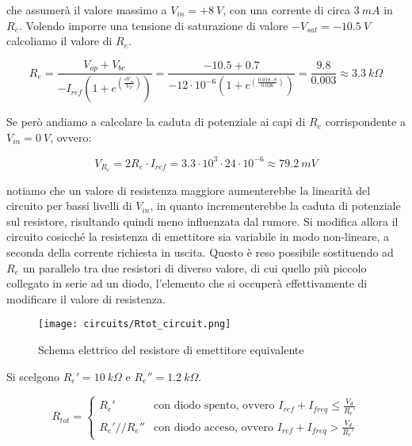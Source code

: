 che assumerà il valore massimo a $V_{in}=+8\ V$, con una corrente di circa $3\ mA$  in $R_e$.
Volendo imporre una tensione di saturazione di valore $-V_{sat}=-10.5\ V$ calcoliamo il valore
di $R_e$.

\begin{equation}
    R_e=\frac{V_{op}+V_{be}}{-I_{ref}\left(1+e^{\left(\frac{sV_{in}}{V_T}\right)}\right)}=
    \frac{-10.5+0.7}{-12\cdot10^{-6}\left(1+e^{\left(\frac{0.018\cdot8}{0.026}\right)}\right)}=
    \frac{9.8}{0.003}\approx 3.3\ k\Omega
\end{equation}

Se però andiamo a calcolare la caduta di potenziale ai capi di $R_e$ corrispondente a $V_{in}=0\ V$,
ovvero:

\begin{equation}\label{vre}
    V_{R_e}=2R_e\cdot I_{ref}=3.3\cdot10^3\cdot24\cdot10^{-6}\approx79.2\ mV
\end{equation}

notiamo che un valore di resistenza maggiore aumenterebbe la linearità del circuito per bassi
livelli di $V_{in}$, in quanto incrementerebbe la caduta di potenziale sul resistore,
risultando quindi meno influenzata dal rumore. Si modifica allora il circuito cosicché la
resistenza di emettitore sia variabile in modo non-lineare, a seconda della corrente richiesta
in uscita. Questo è reso possibile sostituendo ad $R_e$ un parallelo tra due resistori di
diverso valore, di cui quello più piccolo collegato in serie ad un diodo, l'elemento che si
occuperà effettivamente di modificare il valore di resistenza.

\begin{figure}[H]
    \centering
    \texttt{[image: circuits/Rtot\_circuit.png]}
    \caption{Schema elettrico del resistore di emettitore equivalente}
    \label{Rtot_circuit}
\end{figure}

Si scelgono $R_e'=10\ k\Omega$ e $R_e''=1.2\ k\Omega$.

\begin{equation}\label{rtot}
    R_{tot} =
    \left\{
    \begin{array}{lr}
        R_e'        & \text{con diodo spento, ovvero } I_{ref}+I_{freq}\leq\frac{V_d}{R_e'} \\
        R_e'//R_e'' & \text{con diodo acceso, ovvero } I_{ref}+I_{freq}>\frac{V_d}{R_e'}
    \end{array}
    \right.
\end{equation}

